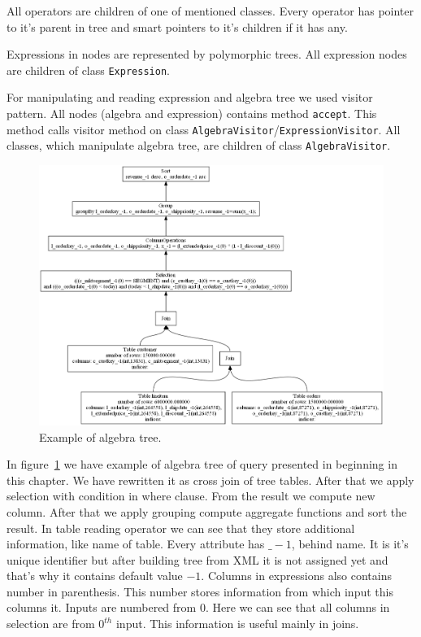 All operators are children of one of mentioned classes. Every operator has pointer to it's parent in tree and smart pointers to it's children if it has any. 

Expressions in nodes are represented by polymorphic trees. All expression nodes are children of class \texttt{Expression}.

For manipulating and reading expression and algebra tree we used visitor pattern. All nodes (algebra and expression) contains method \texttt{accept}. This method calls visitor method on class \texttt{AlgebraVisitor}/\texttt{ExpressionVisitor}. All classes, which manipulate algebra tree, are children of class \texttt{AlgebraVisitor}.


\begin{figure}[h!]
  \centering
    \includegraphics[width=1.0\textwidth]{algebratree1}

      \caption{Example of algebra tree.}
          \label{fig:algebratree1}
\end{figure}

In figure~\ref{fig:algebratree1} we have example of algebra tree of query presented in beginning in this chapter. We have rewritten it as cross join of tree tables. After that we apply selection with condition in where clause. From the result we compute new column. After that we apply grouping compute aggregate functions and sort the result. In table reading operator we can see that they store additional information, like name of table. Every attribute has $\_-1$, behind name. It is it's unique identifier but after building tree from XML it is not assigned yet and that's why it contains default value $-1$. Columns in expressions also contains number in parenthesis. This number stores information from which input this columns it. Inputs are numbered from $0$. Here we can see that all columns in selection are from $0^{th}$ input. This information is useful mainly in joins.

